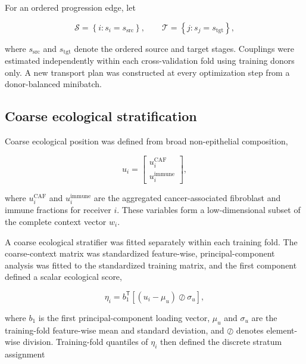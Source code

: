 For an ordered progression edge, let

\begin{equation}
\mathcal{S}
=
\left\{
i:s_i=s_{\mathrm{src}}
\right\},
\qquad
\mathcal{T}
=
\left\{
j:s_j=s_{\mathrm{tgt}}
\right\},
\label{eq:methods-source-target-sets}
\end{equation}

where \(s_{\mathrm{src}}\) and \(s_{\mathrm{tgt}}\) denote the ordered source
and target stages. Couplings were estimated independently within each
cross-validation fold using training donors only. A new transport plan was
constructed at every optimization step from a donor-balanced minibatch.

\subsection{Coarse ecological stratification}
\label{sec:methods-stratification}

Coarse ecological position was defined from broad non-epithelial composition,

\begin{equation}
u_i
=
\begin{bmatrix}
u_i^{\mathrm{CAF}} \\
u_i^{\mathrm{immune}}
\end{bmatrix},
\label{eq:methods-coarse-context}
\end{equation}

where \(u_i^{\mathrm{CAF}}\) and \(u_i^{\mathrm{immune}}\) are the aggregated
cancer-associated fibroblast and immune fractions for receiver \(i\). These
variables form a low-dimensional subset of the complete context vector \(w_i\).

A coarse ecological stratifier was fitted separately within each training fold.
The coarse-context matrix was standardized feature-wise, principal-component
analysis was fitted to the standardized training matrix, and the first
component defined a scalar ecological score,

\begin{equation}
\eta_i
=
b_1^{\mathsf T}
\left[
\left(
u_i-\mu_u
\right)
\oslash
\sigma_u
\right],
\label{eq:methods-niche-score}
\end{equation}

where \(b_1\) is the first principal-component loading vector, \(\mu_u\) and
\(\sigma_u\) are the training-fold feature-wise mean and standard deviation,
and \(\oslash\) denotes element-wise division. Training-fold quantiles of
\(\eta_i\) then defined the discrete stratum assignment

